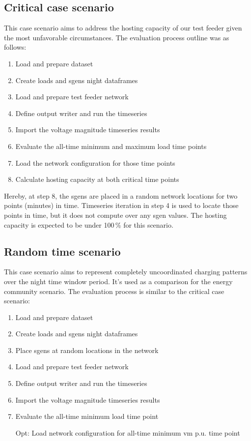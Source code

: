 \documentclass[a4paper,10pt]{report}
\begin{document}
\subsection{Critical case scenario}
This case scenario aims to address the hosting capacity of our test feeder given the most unfavorable circumstances. The evaluation process outline was as follows:
\begin{enumerate}
	\item Load and prepare dataset
	\item Create loads and sgens night dataframes
	\item Load and prepare test feeder network
	\item Define output writer and run the timeseries
	\item Import the voltage magnitude timeseries results
	\item Evaluate the all-time minimum and maximum load time points
	\item Load the network configuration for those time points
	\item Calculate hosting capacity at both critical time points
\end{enumerate}

Hereby, at step 8, the sgens are placed in a random network locations for two points (minutes) in time. Timeseries iteration in step 4 is used to locate those points in time, but it does not compute over any sgen values. The hosting capacity is expected to be under 100\,\% for this scenario.

\subsection{Random time scenario}
This case scenario aims to represent completely uncoordinated charging patterns over the night time window period. It's used as a comparison for the energy community scenario. The evaluation process is similar to the critical case scenario:
\begin{enumerate}
	\item Load and prepare dataset
	\item Create loads and sgens night dataframes
	\item Place sgens at random locations in the network
	\item Load and prepare test feeder network
	\item Define output writer and run the timeseries
	\item Import the voltage magnitude timeseries results
	\item Evaluate the all-time minimum load time point
	\item[Opt:] Load network configuration for all-time minimum vm p.u. time point
\end{enumerate}
\end{document}
